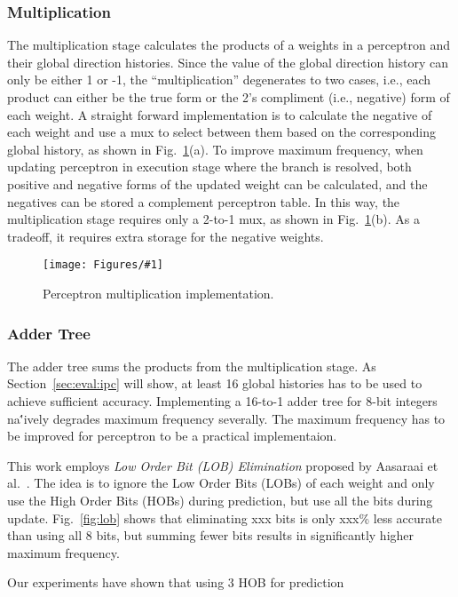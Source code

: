 \documentclass[conference]{IEEEtran}
\newcommand{\kfig}[4]{ %
        \begin{figure}[!t]
        \centering
        \texttt{[image: Figures/\#1]}
        \vspace{-1mm}
        \caption{#3}
        \label{#2}
        \end{figure}
}
\begin{document}
\subsubsection{Multiplication}
\label{sec:fpga:perceptron:mult}
The multiplication stage calculates the products of a weights in a perceptron and their global direction histories. Since the value of the global direction history can only be either 1 or -1, the ``multiplication'' degenerates to two cases, i.e., each product can either be the true form or the 2's compliment (i.e., negative) form of each weight. A straight forward implementation is to calculate the negative of each weight and use a mux to select between them based on the corresponding global history, as shown in Fig.~\ref{fig:perceptronMult}(a). To improve maximum frequency, when updating perceptron in execution stage where the branch is resolved, both positive and negative forms of the updated weight can be calculated, and the negatives can be stored a complement perceptron table. In this way, the multiplication stage requires only a 2-to-1 mux, as shown in Fig.~\ref{fig:perceptronMult}(b). As a tradeoff, it requires extra storage for the negative weights.
\kfig{perceptronMult.pdf}{fig:perceptronMult}{Perceptron multiplication implementation.}{angle = 0, trim = 0.3in 2in 3in 0.6in, clip, width=0.4\textwidth}

\subsubsection{Adder Tree}
\label{sec:fpga:perceptron:adder}
The adder tree sums the products from the multiplication stage. As Section~\ref{sec:eval:ipc} will show, at least 16 global histories has to be used to achieve sufficient accuracy. Implementing a 16-to-1 adder tree for 8-bit integers na\''ively degrades maximum frequency severally. The maximum frequency has to be improved for perceptron to be a practical implementaion.

This work employs \textit{Low Order Bit (LOB) Elimination} proposed by Aasaraai et al.~\cite{lob}. The idea is to ignore the Low Order Bits (LOBs) of each weight and only use the High Order Bits (HOBs) during prediction, but use all the bits during update.
Fig.~\ref{fig:lob} shows that eliminating xxx bits is only xxx\% less accurate than using all 8 bits, but summing fewer bits results in significantly higher maximum frequency. 



Our experiments have shown that using 3 HOB for prediction 
\end{document}
